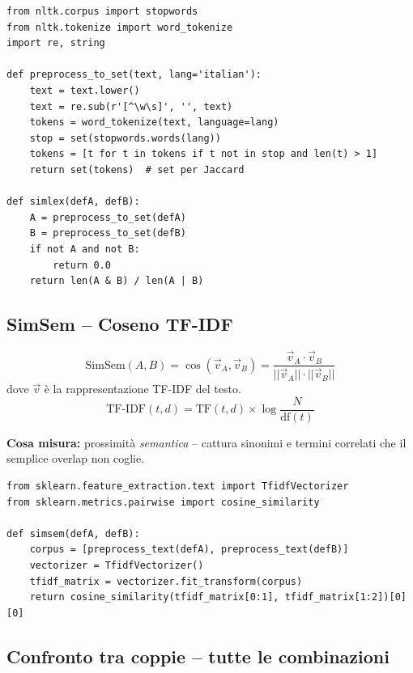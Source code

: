 \documentclass[12pt,a4paper]{article}
\begin{document}
\begin{codebox}
\begin{lstlisting}[style=python]
from nltk.corpus import stopwords
from nltk.tokenize import word_tokenize
import re, string

def preprocess_to_set(text, lang='italian'):
    text = text.lower()
    text = re.sub(r'[^\w\s]', '', text)
    tokens = word_tokenize(text, language=lang)
    stop = set(stopwords.words(lang))
    tokens = [t for t in tokens if t not in stop and len(t) > 1]
    return set(tokens)  # set per Jaccard

def simlex(defA, defB):
    A = preprocess_to_set(defA)
    B = preprocess_to_set(defB)
    if not A and not B:
        return 0.0
    return len(A & B) / len(A | B)
\end{lstlisting}
\end{codebox}

\subsection{SimSem -- Coseno TF-IDF}

\begin{formulabox}
\[
\text{SimSem}(A, B) = \cos(\vec{v}_A, \vec{v}_B) = \frac{\vec{v}_A \cdot \vec{v}_B}{||\vec{v}_A|| \cdot ||\vec{v}_B||}
\]
dove $\vec{v}$ \`e la rappresentazione TF-IDF del testo.
\[
\text{TF-IDF}(t, d) = \text{TF}(t,d) \times \log\frac{N}{\text{df}(t)}
\]
\end{formulabox}

\textbf{Cosa misura:} prossimit\`a \emph{semantica} -- cattura sinonimi e termini correlati che il semplice overlap non coglie.

\begin{codebox}
\begin{lstlisting}[style=python]
from sklearn.feature_extraction.text import TfidfVectorizer
from sklearn.metrics.pairwise import cosine_similarity

def simsem(defA, defB):
    corpus = [preprocess_text(defA), preprocess_text(defB)]
    vectorizer = TfidfVectorizer()
    tfidf_matrix = vectorizer.fit_transform(corpus)
    return cosine_similarity(tfidf_matrix[0:1], tfidf_matrix[1:2])[0][0]
\end{lstlisting}
\end{codebox}

\subsection{Confronto tra coppie -- tutte le combinazioni}
\end{document}
